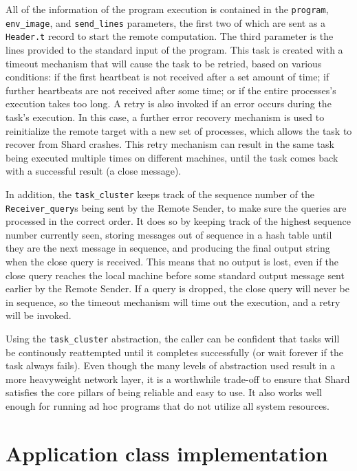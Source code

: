 \documentclass[oneside]{report}
\begin{document}
\begin{sloppypar}
  All of the information of the program execution is contained in the \texttt{program}, \texttt{env\_image}, and \texttt{send\_lines} parameters, the first two of which are sent as a \texttt{Header.t} record to start the remote computation. The third parameter is the lines provided to the standard input of the program.
  This task is created with a timeout mechanism that will cause the task to be retried, based on various conditions: if the first heartbeat is not received after a set amount of time; if further heartbeats are not received after some time; or if the entire processes's execution takes too long.
  A retry is also invoked if an error occurs during the task's execution.
  In this case, a further error recovery mechanism is used to reinitialize the remote target with a new set of processes, which allows the task to recover from Shard crashes.
  This retry mechanism can result in the same task being executed multiple times on different machines, until the task comes back with a successful result (a close message).
\end{sloppypar}

In addition, the \texttt{task\_cluster} keeps track of the sequence number of the \texttt{Receiver\_query}s being sent by the Remote Sender, to make sure the queries are processed in the correct order.
It does so by keeping track of the highest sequence number currently seen, storing messages out of sequence in a hash table until they are the next message in sequence, and producing the final output string when the close query is received.
This means that no output is lost, even if the close query reaches the local machine before some standard output message sent earlier by the Remote Sender.
If a query is dropped, the close query will never be in sequence, so the timeout mechanism will time out the execution, and a retry will be invoked.

Using the \texttt{task\_cluster} abstraction, the caller can be confident that tasks will be continously reattempted until it completes successfully (or wait forever if the task always fails).
Even though the many levels of abstraction used result in a more heavyweight network layer, it is a worthwhile trade-off to ensure that Shard satisfies the core pillars of being reliable and easy to use. It also works well enough for running ad hoc programs that do not utilize all system resources.

\section{Application class implementation}
\end{document}
